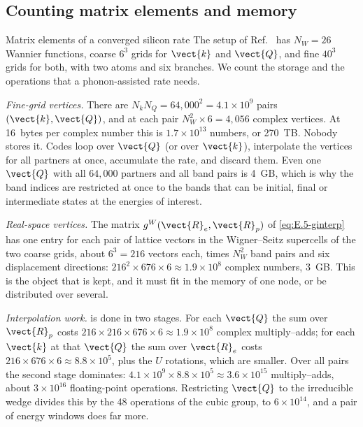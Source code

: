 \subsection{Counting matrix elements and memory}

\begin{workedexample}{Matrix elements of a converged silicon rate}\label{we:E-counts}
The setup of Ref.~\cite{noffsinger2012phonon} has $N_W = 26$ Wannier functions, coarse $6^3$ grids for $\vect{k}$ and $\vect{Q}$, and fine $40^3$ grids for both, with two atoms and six branches. We count the storage and the operations that a phonon-assisted rate needs.

\emph{Fine-grid vertices.} There are $N_k N_Q = 64{,}000^2 = 4.1\times10^9$ pairs $(\vect{k},\vect{Q})$, and at each pair $N_W^2\times6 = 4{,}056$ complex vertices. At \SI{16}{bytes} per complex number this is $1.7\times10^{13}$ numbers, or \SI{270}{TB}. Nobody stores it. Codes loop over $\vect{Q}$ (or over $\vect{k}$), interpolate the vertices for all partners at once, accumulate the rate, and discard them. Even one $\vect{Q}$ with all $64{,}000$ partners and all band pairs is \SI{4}{GB}, which is why the band indices are restricted at once to the bands that can be initial, final or intermediate states at the energies of interest.

\emph{Real-space vertices.} The matrix $g^W(\vect{R}_e,\vect{R}_p)$ of \cref{eq:E.5-ginterp} has one entry for each pair of lattice vectors in the Wigner--Seitz supercells of the two coarse grids, about $6^3 = 216$ vectors each, times $N_W^2$ band pairs and six displacement directions: $216^2\times676\times6 \approx 1.9\times10^8$ complex numbers, \SI{3}{GB}. This is the object that is kept, and it must fit in the memory of one node, or be distributed over several.

\emph{Interpolation work.}  is done in two stages. For each $\vect{Q}$ the sum over $\vect{R}_p$ costs $216\times216\times676\times6 \approx 1.9\times10^8$ complex multiply--adds; for each $\vect{k}$ at that $\vect{Q}$ the sum over $\vect{R}_e$ costs $216\times676\times6 \approx 8.8\times10^5$, plus the $U$ rotations, which are smaller. Over all pairs the second stage dominates: $4.1\times10^9\times8.8\times10^5 \approx 3.6\times10^{15}$ multiply--adds, about $3\times10^{16}$ floating-point operations. Restricting $\vect{Q}$ to the irreducible wedge divides this by the 48 operations of the cubic group, to $6\times10^{14}$, and a pair of energy windows does far more.


\end{workedexample}
